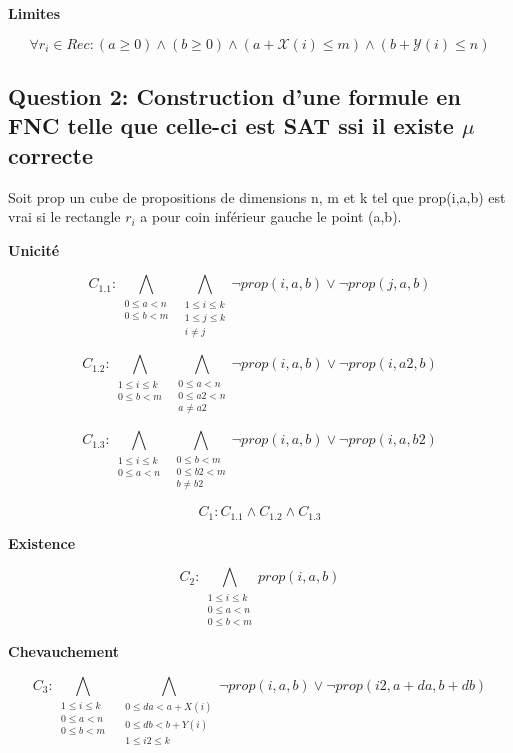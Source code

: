 \documentclass[a4paper,10pt]{article}
\begin{document}
\textbf{Limites}

\begin{equation}
\label{eq:limites}
\forall r_i \in Rec : (a \geq 0) \land (b \geq 0) \land (a+\mathcal{X}(i) \leq m) \land (b + \mathcal{Y}(i) \leq n)
\end{equation}

\newpage

\subsection{Question 2: Construction d'une formule en FNC telle que celle-ci est SAT ssi il existe $\mu$ correcte}

Soit prop un cube de propositions de dimensions n, m et k tel que prop(i,a,b) est vrai si le rectangle $r_i$ a pour coin inférieur gauche le point (a,b).

\textbf{Unicité}

$$C_{1.1} : \bigwedge_{\substack{0 \leq a < n \\ 0 \leq b < m}}\; \bigwedge_{\substack{1 \leq i \leq k \\ 1 \leq j \leq k \\ i \neq j}} \neg prop(i,a,b) \lor \neg prop(j,a,b)$$

$$C_{1.2} : \bigwedge_{\substack{1 \leq i \leq k \\ 0 \leq b < m}}\; \bigwedge_{\substack{0 \leq a < n \\ 0 \leq a2 < n \\ a \neq a2}} \neg prop(i,a,b) \lor \neg prop(i,a2,b)$$

$$C_{1.3} : \bigwedge_{\substack{1 \leq i \leq k \\ 0 \leq a < n}}\; \bigwedge_{\substack{0 \leq b < m \\ 0 \leq b2 < m \\ b \neq b2}} \neg prop(i,a,b) \lor \neg prop(i,a,b2)$$

\begin{center}
$$C_1: C_{1.1} \wedge C_{1.2} \wedge C_{1.3}$$
\end{center}

\textbf{Existence}

$$C_2 : \bigwedge_{\substack{1 \leq i \leq k \\ 0 \leq a < n \\ 0 \leq b < m }} prop(i,a,b) $$

\textbf{Chevauchement}

$$C_3 : \bigwedge_{\substack{1 \leq i \leq k \\ 0 \leq a < n \\ 0 \leq b < m}}\;\; \bigwedge_{\substack{0 \leq da< a + X(i) \\ 0 \leq db < b + Y(i) \\ 1 \leq i2 \leq k}} \neg prop(i,a,b) \lor \neg prop(i2,a+da,b+db)$$
\end{document}

